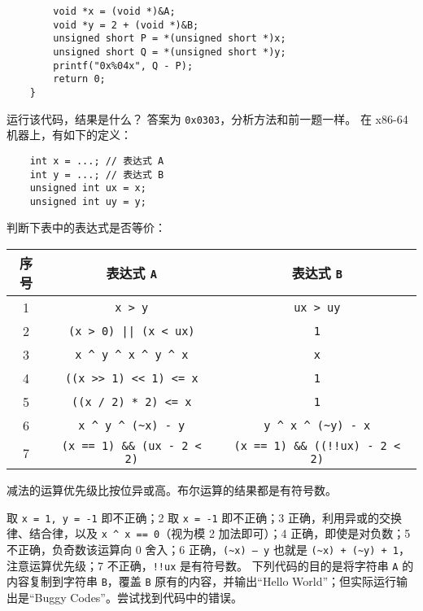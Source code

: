 \begin{problems}
\begin{verbatim}
        void *x = (void *)&A;
        void *y = 2 + (void *)&B;
        unsigned short P = *(unsigned short *)x;
        unsigned short Q = *(unsigned short *)y;
        printf("0x%04x", Q - P);
        return 0;
    }
        \end{verbatim}
        运行该代码，结果是什么？
        \sol 答案为 \verb|0x0303|，分析方法和前一题一样。
        \pro 在 x86-64 机器上，有如下的定义：
        \begin{verbatim}
    int x = ...; // 表达式 A
    int y = ...; // 表达式 B
    unsigned int ux = x;
    unsigned int uy = y;
        \end{verbatim}
        判断下表中的表达式是否等价：
        \begin{table}[H]
            \centering
            \begin{tabular}{|c|c|c|}
                \hline
                序号 & 表达式 \verb|A| & 表达式 \verb|B| \\ \hline
                1 & \verb|x > y| & \verb|ux > uy| \\ \hline
                2 & \verb+(x > 0) || (x < ux)+ & \verb|1| \\ \hline
                3 & \verb|x ^ y ^ x ^ y ^ x| & \verb|x| \\ \hline
                4 & \verb|((x >> 1) << 1) <= x| & \verb|1| \\ \hline
                5 & \verb|((x / 2) * 2) <= x| & \verb|1| \\ \hline
                6 & \verb|x ^ y ^ (~x) - y| & \verb|y ^ x ^ (~y) - x| \\ \hline
                7 & \verb|(x == 1) && (ux - 2 < 2)| & \verb|(x == 1) && ((!!ux) - 2 < 2)| \\ \hline
            \end{tabular}
        \end{table}
        \begin{hint}
            减法的运算优先级比按位异或高。布尔运算的结果都是有符号数。
        \end{hint}
         取 \verb|x = 1, y = -1| 即不正确；2 取 \verb|x = -1| 即不正确；3 正确，利用异或的交换律、结合律，以及 \verb|x ^ x == 0|（视为模 2 加法即可）；4 正确，即使是对负数；5 不正确，负奇数该运算向 0 舍入；6 正确，\verb|(~x) – y| 也就是 \verb|(~x) + (~y) + 1|，注意运算优先级；7 不正确，\verb|!!ux| 是有符号数。
        \pro 下列代码的目的是将字符串 \texttt{A} 的内容复制到字符串 \texttt{B}，覆盖 \texttt{B} 原有的内容，并输出“Hello World”；但实际运行输出是“Buggy Codes”。尝试找到代码中的错误。

\end{problems}
